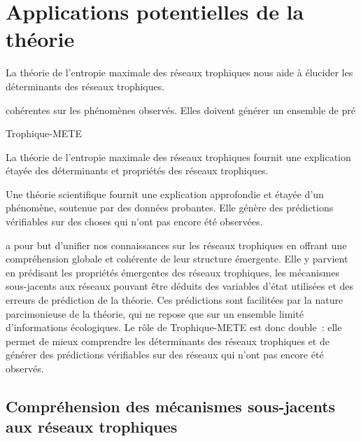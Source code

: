 
\section{Applications potentielles de la théorie} 

La théorie de l'entropie maximale des réseaux trophiques nous aide à élucider
les déterminants des réseaux trophiques.

cohérentes sur les phénomènes observés. Elles doivent 
générer un ensemble de pré


Trophique-METE 



La théorie de l'entropie maximale des réseaux trophiques fournit une explication
étayée des déterminants et propriétés des réseaux trophiques. 

Une théorie scientifique fournit une explication approfondie et étayée d'un phénomène, 
soutenue par des données probantes. Elle génère 
des prédictions vérifiables sur des choses qui n'ont pas encore été observées.

a pour but d'unifier
nos connaissances sur les réseaux trophiques en offrant une compréhension
globale et cohérente de leur structure émergente. Elle y parvient en prédisant
les propriétés émergentes des réseaux trophiques, les mécanismes sous-jacents
aux réseaux pouvant être déduits des variables d'état utilisées et des erreurs
de prédiction de la théorie. Ces prédictions sont facilitées par la nature
parcimonieuse de la théorie, qui ne repose que sur un ensemble limité
d'informations écologiques. Le rôle de Trophique-METE est donc double~: elle
permet de mieux comprendre les déterminants des réseaux trophiques et de générer
des prédictions vérifiables sur des réseaux qui n'ont pas encore été observés.

\subsection{Compréhension des mécanismes sous-jacents aux réseaux trophiques} 

